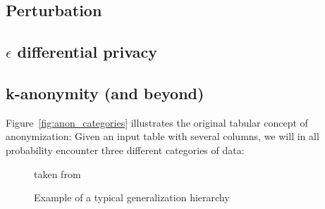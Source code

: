 \documentclass{llncs}
\begin{document}
\subsection{Perturbation}
\label{ssect:perturbation}

\subsection{$\epsilon$  differential privacy}
\label{ssect:eps_priv}

\subsection{k-anonymity (and beyond)}
\label{ssect:k_anon}

Figure~\ref{fig:anon_categories} illustrates the original tabular concept of anonymization: Given an input table with several columns, we will in all probability encounter three different categories of data:


\begin{figure}[!t]
	\begin{center}
		\caption{Example of a typical generalization hierarchy}
		\label{fig:gen_hierarchy}
		\small
		taken from \cite{aggarwal2005approximation}
	\end{center}
\end{figure}
\end{document}
